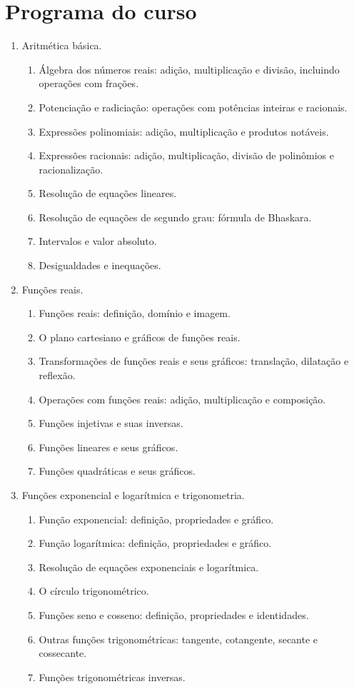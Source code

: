 \chapter{Programa do curso}

\begin{small}
\begin{enumerate}
\item Aritmética básica.
\begin{enumerate}[1.1]
\item Álgebra dos números reais: adição, multiplicação e divisão, incluindo operações com frações.
\item Potenciação e radiciação: operações com potências inteiras e racionais.
\item Expressões polinomiais: adição, multiplicação e produtos notáveis.
\item Expressões racionais: adição, multiplicação, divisão de polinômios e racionalização.
\item Resolução de equações lineares.
\item Resolução de equações de segundo grau: fórmula de Bhaskara.
\item Intervalos e valor absoluto.
\item Desigualdades e inequações.
\end{enumerate}

\item Funções reais.
\begin{enumerate}[2.1]
\item Funções reais: definição, domínio e imagem.
\item O plano cartesiano e gráficos de funções reais.
\item Transformações de funções reais e seus gráficos: translação, dilatação e reflexão.
\item Operações com funções reais: adição, multiplicação e composição.
\item Funções injetivas e suas inversas.
\item Funções lineares e seus gráficos.
\item Funções quadráticas e seus gráficos.
\end{enumerate}

\item Funções exponencial e logarítmica e trigonometria.
\begin{enumerate}[3.1]
\item Função exponencial: definição, propriedades e gráfico.
\item Função logarítmica: definição, propriedades e gráfico.
\item Resolução de equações exponenciais e logarítmica.
\item O círculo trigonométrico.
\item Funções seno e cosseno: definição, propriedades e identidades.
\item Outras funções trigonométricas: tangente, cotangente, secante e cossecante.
\item Funções trigonométricas inversas.
\end{enumerate}
\end{enumerate}
\end{small}